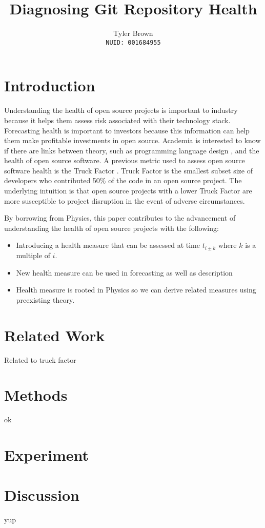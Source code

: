 \documentclass{article}
\title{Diagnosing Git Repository Health}
\author{%
  Tyler Brown\\
  \texttt{NUID: 001684955} \\
}
\begin{document}

\maketitle

\section{Introduction}

Understanding the health of open source projects is important to
industry because it helps them assess risk associated with their
technology stack. Forecasting health is important to investors because
this information can help them make profitable investments in open
source. Academia is interested to know if there are links between
theory, such as programming language design \cite{ray2014large}, and the
health of open source software. A previous metric used to assess open source
software health is the Truck Factor \cite{avelino2015truck}. Truck Factor
is the smallest subset size of developers who contributed 50\% of the code
in an open source project. The underlying intuition is that open source
projects with a lower Truck Factor are more susceptible to project disruption
in the event of adverse circumstances.

By borrowing from Physics, this paper contributes to the advancement of
understanding the health of open source projects with the following:

\begin{itemize}
\item Introducing a health measure that can be assessed at time
  $t_{i \pm k}$ where $k$ is a multiple of $i$.
\item New health measure can be used in forecasting as well as description
\item Health measure is rooted in Physics so we can derive related measures
  using preexisting theory.
\end{itemize}

\section{Related Work}

Related to truck factor

\section{Methods}

ok

 \section{Experiment}

 \section{Discussion}

 yup



\end{document}
